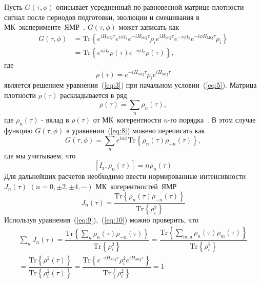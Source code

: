\documentclass[utf8]{jetp}
\begin{document}
Пусть $G(\tau,\phi)$ описывает усредненный по равновесной матрице плотности сигнал после периодов подготовки, эволюции и смешивания в МК~эксперименте~ЯМР~\cite{Baum_1985}.
$G(\tau,\phi)$ может записать как~\cite{Doronin_2019}
%
\begin{equation}
  \begin{split}
    \label{eq:8}
    G(\tau,\phi)
    & = \mathrm{Tr}\left\{
      e^{i H_\mathrm{MQ} \tau} e^{i\phi I_\mathrm{z}} e^{-i H_\mathrm{MQ}\tau}
      \rho_i
      e^{i H_\mathrm{MQ} \tau} e^{-i \phi I_\mathrm{z}} e^{-i \phi H_\mathrm{MQ} \tau}
      \rho_i
    \right\} \\
    & = \mathrm{Tr} \left\{
    e^{i \phi I_\mathrm{z}}
    \rho(\tau)
    e^{-i \phi I_\mathrm{z}}
    \rho(\tau)
    \right\},
  \end{split}
\end{equation}
%
где
%
\begin{equation}
  \label{eq:9}
  \rho(\tau)
  = e^{-i H_\mathrm{MQ} \tau }
  \rho_i
  e^{i H_\mathrm{MQ} \tau}
\end{equation}
%
является решением уравнения~(\ref{eq:3}) при начальном условии~(\ref{eq:5}).
Матрица плотности $\rho(\tau)$ раскладывается в ряд
%
\begin{equation}
  \label{eq:10}
  \rho(\tau) = \sum\limits_n \rho_n(\tau),
\end{equation}
%
где $\rho_{n}(\tau)$ - вклад в $\rho(\tau)$ от МК~когерентности $n$-го порядка~\cite{Fel_dman_1996}.
В этом случае функцию $G(\tau,\phi)$ в уравнении~(\ref{eq:8}) можено переписать как
%
\begin{equation}
  \label{eq:11}
  G(\tau,\phi)
  = \sum\limits_n e^{i n \phi} \mathrm{Tr} \left\{
    \rho_{n}(\tau) \rho_{-n}(\tau)
  \right\},
\end{equation}
%
где мы учитываем, что
%
\begin{equation}
  \label{eq:12}
  \left[ I_{\mathrm{z}},\rho_n(\tau) \right] = n \rho_n(\tau)
\end{equation}
%
Для дальнейших расчетов необходимо ввести нормированные интенсивности $J_{n}(\tau)$ $(n=0, \pm 2, \pm 4, \cdots)$ МК~когерентностей~ЯМР
%
\begin{equation}
  \label{eq:13}
  J_{n}(\tau) = \dfrac{\mathrm{Tr} \left\{
  \rho_{n}(\tau) \rho_{-n}(\tau)
  \right\}}
  {\mathrm{Tr} \left\{\rho^2_{i} \right\}}
\end{equation}
%
Используя уравнения~(\ref{eq:9}),~(\ref{eq:10}) можно проверить, что
%
\begin{multline}
  \label{eq:14}
  \sum\limits_{n} J_{n}(\tau)
  = \dfrac{
    \mathrm{Tr} \left\{
      \sum_{n} \rho_{n}(\tau) \rho_{-n}(\tau)
    \right\}}
  {\mathrm{Tr} \left\{ \rho^2_{i} \right\}}
  = \dfrac{
    \mathrm{Tr} \left\{
      \sum_{\mathrm{m,n}} \rho_n(\tau)\rho_m(\tau)
  \right\}}
  {\mathrm{Tr} \left\{\rho^2_{i}\right\}}
  \\
  = \dfrac{
    \mathrm{Tr}\left\{\rho^2(\tau)\right\}
  }
  {
    \mathrm{Tr}\left\{\rho^2_{i}(\tau)\right\}
  }
  = \dfrac{
    \mathrm{Tr} \left\{
      e^{-i H_\mathrm{MQ} \tau}
      \rho^{2}_{i}
      e^{i H_\mathrm{MQ} \tau}
    \right\}
  }
  {
    \mathrm{Tr} \left\{ \rho_{i}^{2} \right\}
  }
  = 1
\end{multline}
\end{document}
